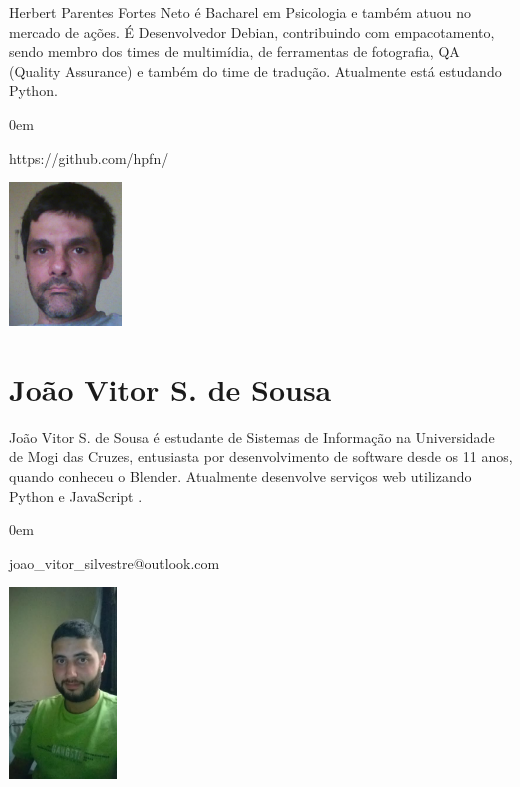 Herbert Parentes Fortes Neto é Bacharel em Psicologia e também atuou no mercado de ações. É Desenvolvedor Debian, contribuindo com empacotamento, sendo membro dos times de multimídia, de ferramentas de fotografia, QA (Quality Assurance) e também do time de tradução. Atualmente está estudando Python.

\begin{description}
\itemsep0em 
\item[GitHub] https://github.com/hpfn/
\end{description}

\beforefig
\centerline{\includegraphics[height=1.50in]{translators/herbertfortes.eps}}
\afterfig

\section*{João Vitor S. de Sousa}

João Vitor S. de Sousa é estudante de Sistemas de Informação na Universidade de Mogi das Cruzes, entusiasta por desenvolvimento de software desde os 11 anos, quando conheceu o Blender. Atualmente desenvolve serviços web utilizando Python e JavaScript .

\begin{description}
\itemsep0em 
\item[E-mail] joao_vitor_silvestre@outlook.com
\end{description}

\beforefig
\centerline{\includegraphics[height=2.00in]{translators/joaovitorsilvestre.eps}}
\afterfig

\newpage

